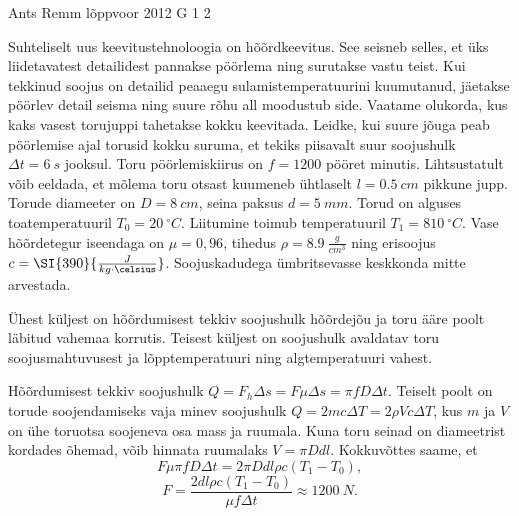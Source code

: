 {Ants Remm} %
{lõppvoor} %
{2012} %
{G 1} %
{2} %
{
\ifStatement
Suhteliselt uus keevitustehnoloogia on hõõrdkeevitus. See seisneb selles, et üks
liidetavatest detailidest pannakse pöörlema ning surutakse vastu teist. Kui
tekkinud soojus on detailid peaaegu sulamistemperatuurini kuumutanud, jäetakse
pöörlev detail seisma ning suure rõhu all moodustub side. Vaatame olukorda, kus
kaks vasest torujuppi tahetakse kokku keevitada. Leidke, kui suure jõuga peab
pöörlemise ajal torusid kokku suruma, et tekiks piisavalt suur soojushulk
$\Delta t = \SI{6}{s}$ jooksul. Toru pöörlemiskiirus on $f = 1200$ pööret
minutis. Lihtsustatult võib eeldada, et mõlema toru otsast kuumeneb ühtlaselt $l
= \SI{0,5}{cm}$ pikkune jupp. Torude diameeter on $D = \SI{8}{cm}$, seina paksus
$d = \SI{5}{mm}$. Torud on alguses toatemperatuuril $T_0 = \SI{20}{^\circ C}$.
Liitumine toimub temperatuuril $T_1 = \SI{810}{^\circ C}$. Vase hõõrdetegur
iseendaga on $\mu = 0,96$, tihedus $\rho = \SI{8,9}{\frac{g}{cm^3}}$ ning
erisoojus $c = \SI{390}{\frac{J}{kg \cdot \celsius}}$. Soojuskadudega ümbritsevasse
keskkonda mitte arvestada.
\fi


\ifHint
Ühest küljest on hõõrdumisest tekkiv soojushulk hõõrdejõu ja toru ääre poolt läbitud vahemaa korrutis. Teisest küljest on soojushulk avaldatav toru soojusmahtuvusest ja lõpptemperatuuri ning algtemperatuuri vahest.
\fi


\ifSolution
Hõõrdumisest tekkiv soojushulk $Q = F_h \Delta s = F \mu \Delta s = \pi f D \Delta t$. Teiselt poolt on torude soojendamiseks vaja minev soojushulk $Q = 2 m c \Delta T = 2 \rho V c \Delta T$, kus $m$ ja $V$ on ühe toruotsa soojeneva osa mass ja ruumala. Kuna toru seinad on diameetrist kordades õhemad, võib hinnata ruumalaks $V = \pi D d l$. Kokkuvõttes saame, et
\[
F \mu \pi f D \Delta t = 2 \pi D d l \rho c ( T_1 - T_0 ),
\]
\[
F = \frac{2 d l \rho c ( T_1 - T_0 )}{ \mu f \Delta t } \approx \SI{1200}{N}.
\]
\fi


}
